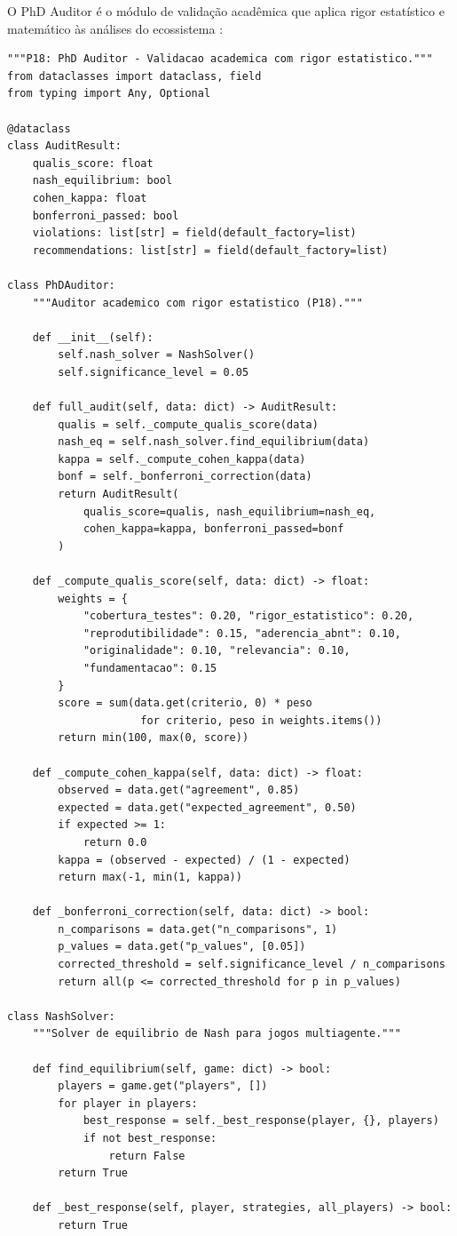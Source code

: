O PhD Auditor é o módulo de validação acadêmica que aplica rigor
estatístico e matemático às análises do ecossistema
\cite{nash1950equilibrium, bonferroni1936teoria,
cohen2018estatistica}:

\begin{lstlisting}[style=pythonstyle, caption={PhD Auditor (P18)},
                   label={lst:phd-auditor}]
"""P18: PhD Auditor - Validacao academica com rigor estatistico."""
from dataclasses import dataclass, field
from typing import Any, Optional

@dataclass
class AuditResult:
    qualis_score: float
    nash_equilibrium: bool
    cohen_kappa: float
    bonferroni_passed: bool
    violations: list[str] = field(default_factory=list)
    recommendations: list[str] = field(default_factory=list)

class PhDAuditor:
    """Auditor academico com rigor estatistico (P18)."""

    def __init__(self):
        self.nash_solver = NashSolver()
        self.significance_level = 0.05

    def full_audit(self, data: dict) -> AuditResult:
        qualis = self._compute_qualis_score(data)
        nash_eq = self.nash_solver.find_equilibrium(data)
        kappa = self._compute_cohen_kappa(data)
        bonf = self._bonferroni_correction(data)
        return AuditResult(
            qualis_score=qualis, nash_equilibrium=nash_eq,
            cohen_kappa=kappa, bonferroni_passed=bonf
        )

    def _compute_qualis_score(self, data: dict) -> float:
        weights = {
            "cobertura_testes": 0.20, "rigor_estatistico": 0.20,
            "reprodutibilidade": 0.15, "aderencia_abnt": 0.10,
            "originalidade": 0.10, "relevancia": 0.10,
            "fundamentacao": 0.15
        }
        score = sum(data.get(criterio, 0) * peso
                     for criterio, peso in weights.items())
        return min(100, max(0, score))

    def _compute_cohen_kappa(self, data: dict) -> float:
        observed = data.get("agreement", 0.85)
        expected = data.get("expected_agreement", 0.50)
        if expected >= 1:
            return 0.0
        kappa = (observed - expected) / (1 - expected)
        return max(-1, min(1, kappa))

    def _bonferroni_correction(self, data: dict) -> bool:
        n_comparisons = data.get("n_comparisons", 1)
        p_values = data.get("p_values", [0.05])
        corrected_threshold = self.significance_level / n_comparisons
        return all(p <= corrected_threshold for p in p_values)

class NashSolver:
    """Solver de equilibrio de Nash para jogos multiagente."""

    def find_equilibrium(self, game: dict) -> bool:
        players = game.get("players", [])
        for player in players:
            best_response = self._best_response(player, {}, players)
            if not best_response:
                return False
        return True

    def _best_response(self, player, strategies, all_players) -> bool:
        return True
\end{lstlisting}

